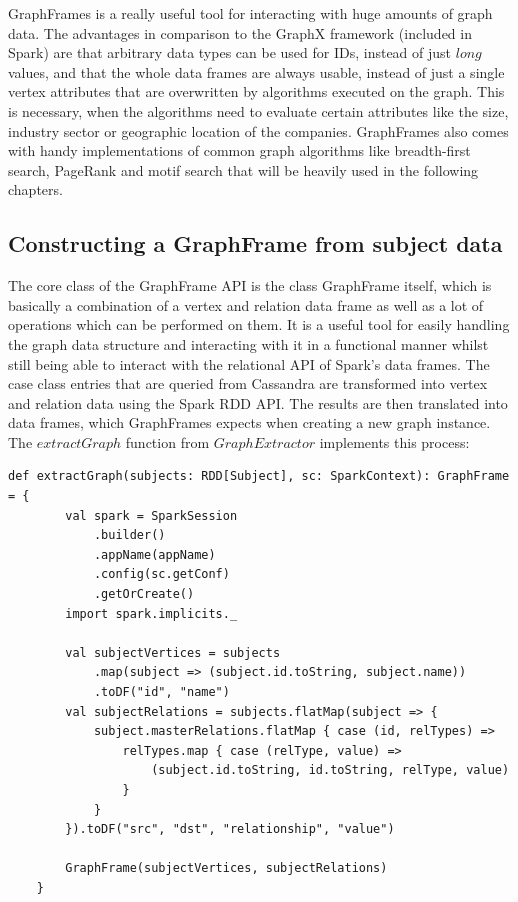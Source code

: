 \documentclass[
        a4paper,     %
        titlepage,   %
        oneside,     %
        parskip      %
]{scrartcl}          %
\begin{document}
    GraphFrames is a really useful tool for interacting with huge amounts of graph
    data. The advantages in comparison to the GraphX framework (included in Spark) are that arbitrary data types
    can be used for IDs, instead of just $long$ values, and that the whole data frames
    are always usable, instead of just a single vertex attributes that are overwritten
    by algorithms executed on the graph. This is necessary, when the algorithms need to
    evaluate certain attributes like the size, industry sector or geographic location of the companies.
    GraphFrames also comes with handy implementations
    of common graph algorithms like breadth-first search, PageRank and motif search
    that will be heavily used in the following chapters.

    \subsection{Constructing a GraphFrame from subject data}
    \label{sec:graphframe_construction}
    The core class of the GraphFrame API is the class GraphFrame itself, which
    is basically a combination of a vertex and relation data frame as well as a
    lot of operations which can be performed on them. It is a useful tool for
    easily handling the graph data structure and interacting with it in a functional
    manner whilst still being able to interact with the relational API of Spark's data frames.
    The case class entries that are queried from Cassandra are transformed into vertex
    and relation data using the Spark RDD API. The results are then translated into
    data frames, which GraphFrames expects when creating a new graph instance.\\
    The $extractGraph$ function from $GraphExtractor$ implements this process:

    \begin{lstlisting}[style=scalaStyle,caption=extractGraph in $GraphExtractor$]
    def extractGraph(subjects: RDD[Subject], sc: SparkContext): GraphFrame = {
  		val spark = SparkSession
  			.builder()
  			.appName(appName)
  			.config(sc.getConf)
  			.getOrCreate()
  		import spark.implicits._

  		val subjectVertices = subjects
  			.map(subject => (subject.id.toString, subject.name))
  			.toDF("id", "name")
  		val subjectRelations = subjects.flatMap(subject => {
  			subject.masterRelations.flatMap { case (id, relTypes) =>
  				relTypes.map { case (relType, value) =>
  					(subject.id.toString, id.toString, relType, value)
  				}
  			}
  		}).toDF("src", "dst", "relationship", "value")

  		GraphFrame(subjectVertices, subjectRelations)
  	}
    \end{lstlisting}
\end{document}
